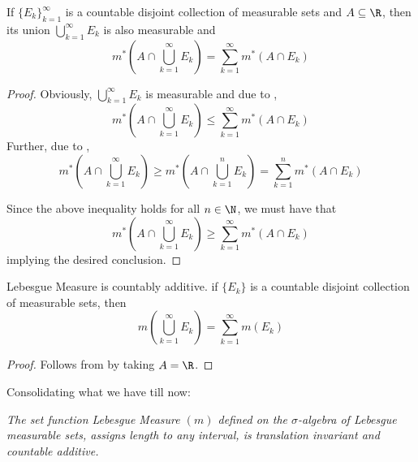 \begin{proposition}
    If $\{E_k\}_{k = 1}^\infty$ is a countable disjoint collection of measurable sets and $A\subseteq\R$, then its union $\bigcup\limits_{k = 1}^\infty E_k$ is also measurable and 
    \begin{equation*}
        m^*\left(A\cap\bigcup_{k = 1}^\infty E_k\right) = \sum_{k = 1}^\infty m^*(A\cap E_k)
    \end{equation*}
\end{proposition}
\begin{proof}
    Obviously, $\bigcup\limits_{k = 1}^\infty E_k$ is measurable and due to , 
    \begin{equation*}
        m^*\left(A\cap\bigcup_{k = 1}^\infty E_k\right)\le\sum_{k = 1}^\infty m^*(A\cap E_k)
    \end{equation*}
    Further, due to , 
    \begin{equation*}
        m^*\left(A\cap\bigcup_{k = 1}^\infty E_k\right)\ge m^*\left(A\cap\bigcup_{k = 1}^n E_k\right) = \sum_{k = 1}^n m^*(A\cap E_k)
    \end{equation*}
    
    Since the above inequality holds for all $n\in\N$, we must have that 
    \begin{equation*}
        m^*\left(A\cap\bigcup_{k = 1}^\infty E_k\right)\ge\sum_{k = 1}^\infty m^*(A\cap E_k)
    \end{equation*}
    implying the desired conclusion.
\end{proof}

\begin{corollary}
    Lebesgue Measure is countably additive. if $\{E_k\}$ is a countable disjoint collection of measurable sets, then 
    \begin{equation*}
        m\left(\bigcup_{k = 1}^\infty E_k\right) = \sum_{k = 1}^\infty m(E_k)
    \end{equation*}
\end{corollary}
\begin{proof}
    Follows from  by taking $A = \R$.
\end{proof}

Consolidating what we have till now: 
\begin{mdframed} 
    \itshape The set function Lebesgue Measure $(m)$ defined on the $\sigma$-algebra of Lebesgue measurable sets, assigns length to any interval, is translation invariant and countable additive.\normalfont
\end{mdframed}

